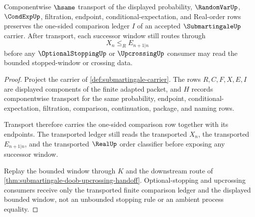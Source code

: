 \begin{theorem}
\label{thm:submartingale-one-sided-comparison-transport}
Componentwise $\hsame$ transport of the displayed probability, $\RandomVarUp$, $\CondExpUp$, filtration, endpoint, conditional-expectation, and Real-order rows preserves the one-sided comparison ledger $I$ of an accepted $\SubmartingaleUp$ carrier. After transport, each successor window still routes through
$$
X_n\leq_R E_{n+1|n}
$$
before any $\OptionalStoppingUp$ or $\UpcrossingUp$ consumer may read the bounded stopped-window or crossing data.
\end{theorem}
\begin{proof}
Project the carrier of \autoref{def:submartingale-carrier}. The rows $R,C,F,X,E,I$ are displayed components of the finite adapted packet, and $H$ records componentwise transport for the same probability, endpoint, conditional-expectation, filtration, comparison, continuation, package, and naming rows.

Transport therefore carries the one-sided comparison row together with its endpoints. The transported ledger still reads the transported $X_n$, the transported $E_{n+1|n}$, and the transported $\RealUp$ order classifier before exposing any successor window.

Replay the bounded window through $K$ and the downstream route of \autoref{thm:submartingale-doob-upcrossing-handoff}. Optional-stopping and upcrossing consumers receive only the transported finite comparison ledger and the displayed bounded window, not an unbounded stopping rule or an ambient process equality.
\end{proof}

